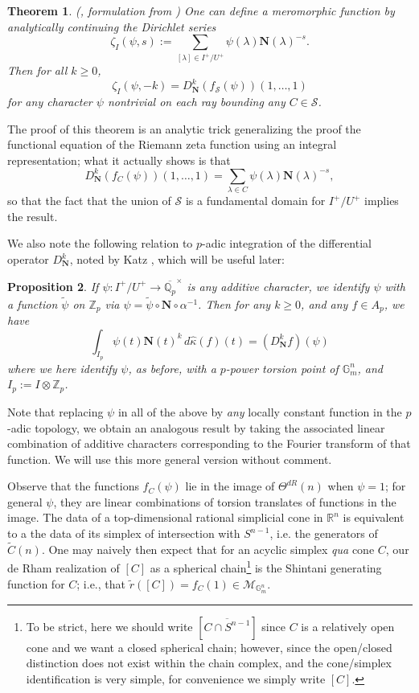\documentclass[10pt]{amsart}
\newtheorem{thm}{Theorem}[section]
\newtheorem{prop}[thm]{Proposition}
\theoremstyle{definition}
\newcommand{\Z}{\mathbb{Z}}
\newcommand{\Q}{\mathbb{Q}}
\newcommand{\R}{\mathbb{R}}
\newcommand{\G}{\mathbb{G}}
\numberwithin{equation}{section}
\begin{document}
    \begin{thm} \emph{(\cite[Prop. 1]{Shin}, formulation from \cite[Theorem 2]{Katz})} \label{thm:shin}
        One can define a meromorphic function by analytically continuing the Dirichlet series
        \[\zeta_{I}(\psi, s) := \sum_{[\lambda]\in I^+/U^+} \psi(\lambda)\mathbf{N}(\lambda)^{-s}.\]
        Then for all $k\ge 0$, 
        \[
        \zeta_I(\psi,-k)= D_{\mathbf{N}}^k(f_{\mathscr{S}}(\psi))(1,\ldots, 1)
        \]
        for any character $\psi$ nontrivial on each ray bounding any $C\in \mathscr{S}$.
    \end{thm}    
    The proof of this theorem is an analytic trick generalizing the proof the functional equation of the Riemann zeta function using an integral representation; what it actually shows is that 
    \[
    D_{\mathbf{N}}^k(f_{C}(\psi))(1,\ldots, 1)=\sum_{\lambda\in C}\psi(\lambda)\mathbf{N}(\lambda)^{-s},
    \]
    so that the fact that the union of $\mathscr{S}$ is a fundamental domain for $I^+/U^+$ implies the result. 

    We also note the following relation to $p$-adic integration of the differential operator $D_\mathbf{N}^k$, noted by Katz \cite[Theorem 1]{Katz}, which will be useful later:

    \begin{prop} \label{prop:katz}
        If $\psi:I^+/U^+\to \overline{\Q_p}^\times$ is any additive character, we identify $\psi$ with a function $\tilde{\psi}$ on $\Z_p$ via $\psi=\tilde{\psi}\circ \mathbf{N}\circ \alpha^{-1}$. Then for any $k\ge 0$, and any $f\in A_p$, we have
        \[
        \int_{I_p} \psi(t) \mathbf{N}(t)^k \, d\widehat{\kappa}(f)(t) = (D^k_{\mathbf{N}}f)(\psi)
        \]
        where we here identify $\psi$, as before, with a $p$-power torsion point of $\G_m^n$, and $I_p:= I\otimes \Z_p$.
    \end{prop}

    Note that replacing $\psi$ in all of the above by \emph{any} locally constant function in the $p$-adic topology, we obtain an analogous result by taking the associated linear combination of additive characters corresponding to the Fourier transform of that function. We will use this more general version without comment.
    
    Observe that the functions $f_C(\psi)$ lie in the image of $\Theta^{dR}(n)$ when $\psi=1$; for general $\psi$, they are linear combinations of torsion translates of functions in the image. The data of a top-dimensional rational simplicial cone in $\R^n$ is equivalent to a the data of its simplex of intersection with $S^{n-1}$, i.e. the generators of $\tilde{C}(n)$. One may naively then expect that for an acyclic simplex \emph{qua} cone $C$, our de Rham realization of $[C]$ as a spherical chain\footnote{To be strict, here we should write $[\overline{C \cap S^{n-1}}]$ since $C$ is a relatively open cone and we want a closed spherical chain; however, since the open/closed distinction does not exist within the chain complex, and the cone/simplex identification is very simple, for convenience we simply write $[C]$.} is the Shintani generating function for $C$; i.e., that $
    \widetilde{r}([C]) = f_C(1)\in \mathcal{M}_{\G_m^n}$.
    
\end{document}
